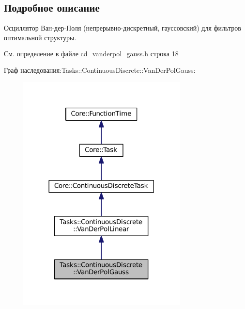 \subsection{Подробное описание}
Осциллятор Ван-\/дер-\/Поля (непрерывно-\/дискретный, гауссовский) для фильтров оптимальной структуры. 

См. определение в файле cd\+\_\+vanderpol\+\_\+gauss.\+h строка 18



Граф наследования\+:Tasks\+:\+:Continuous\+Discrete\+:\+:Van\+Der\+Pol\+Gauss\+:
\nopagebreak
\begin{figure}[H]
\begin{center}
\leavevmode
\includegraphics[width=242pt]{class_tasks_1_1_continuous_discrete_1_1_van_der_pol_gauss__inherit__graph}
\end{center}
\end{figure}


